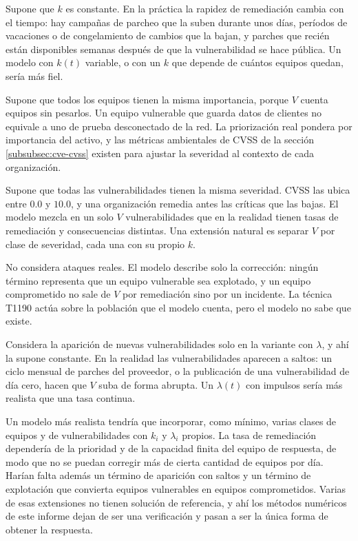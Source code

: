 Supone que $k$ es constante. En la práctica la rapidez de remediación cambia con el tiempo: hay
campañas de parcheo que la suben durante unos días, períodos de vacaciones o de congelamiento
de cambios que la bajan, y parches que recién están disponibles semanas después de que la
vulnerabilidad se hace pública. Un modelo con $k(t)$ variable, o con un $k$ que depende de
cuántos equipos quedan, sería más fiel.

Supone que todos los equipos tienen la misma importancia, porque $V$ cuenta equipos sin pesarlos.
Un equipo vulnerable que guarda datos de clientes no equivale a uno de prueba desconectado de
la red. La priorización real pondera por importancia del activo, y las métricas ambientales de
CVSS de la sección \ref{subsubsec:cve-cvss} existen para ajustar la severidad al contexto de
cada organización.

Supone que todas las vulnerabilidades tienen la misma severidad. CVSS las ubica entre $0.0$ y
$10.0$, y una organización remedia antes las críticas que las bajas. El modelo mezcla en un solo
$V$ vulnerabilidades que en la realidad tienen tasas de remediación y consecuencias distintas.
Una extensión natural es separar $V$ por clase de severidad, cada una con su propio $k$.

No considera ataques reales. El modelo describe solo la corrección: ningún término representa
que un equipo vulnerable sea explotado, y un equipo comprometido no sale de $V$ por remediación
sino por un incidente. La técnica T1190 actúa sobre la población que el modelo cuenta, pero el
modelo no sabe que existe.

Considera la aparición de nuevas vulnerabilidades solo en la variante con $\lambda$, y ahí la
supone constante. En la realidad las vulnerabilidades aparecen a saltos: un ciclo mensual de
parches del proveedor, o la publicación de una vulnerabilidad de día cero, hacen que $V$ suba de
forma abrupta. Un $\lambda(t)$ con impulsos sería más realista que una tasa continua.

Un modelo más realista tendría que incorporar, como mínimo, varias clases de equipos y de
vulnerabilidades con $k_i$ y $\lambda_i$ propios. La tasa de remediación dependería de la
prioridad y de la capacidad finita del equipo de respuesta, de modo que no se puedan corregir
más de cierta cantidad de equipos por día. Harían falta además un término de aparición con
saltos y un término de explotación que convierta equipos vulnerables en equipos comprometidos.
Varias de esas extensiones no tienen solución de referencia, y ahí los métodos numéricos de este
informe dejan de ser una verificación y pasan a ser la única forma de obtener la respuesta.

